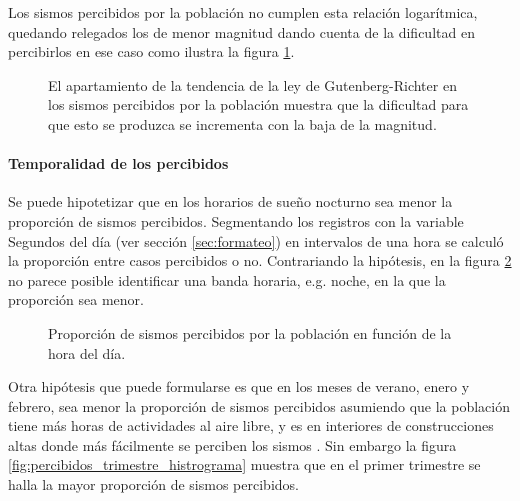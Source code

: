 \documentclass[a4paper]{report}
\begin{document}
Los sismos percibidos por la población no cumplen esta relación logarítmica, quedando relegados los de menor magnitud dando cuenta de la dificultad en percibirlos en ese caso como ilustra la figura \ref{fig:acumulado_anual_magnitud_percibidos}.
\begin{figure}[!ht]
\centering

\vspace{-0.8cm}
\caption{El apartamiento de la tendencia de la ley de Gutenberg-Richter en los sismos percibidos por la población muestra que la dificultad para que esto se produzca se incrementa con la baja de la magnitud.}
\label{fig:acumulado_anual_magnitud_percibidos}
\end{figure}



\paragraph{Temporalidad de los percibidos}\label{sec:temporal}
Se puede hipotetizar que en los horarios de sueño nocturno sea menor la proporción de sismos percibidos.
Segmentando los registros con la variable Segundos del día (ver sección \ref{sec:formateo}) en intervalos de una hora se calculó la proporción entre casos percibidos o no.
Contrariando la hipótesis, en la figura \ref{fig:histograma_percibidos_por_hora} no parece posible identificar una banda horaria, e.g. noche, en la que la proporción sea menor.

\begin{figure}[!ht]
\centering

\vspace{-0.8cm}
\caption{Proporción de sismos percibidos por la población en función de la hora del día.}
\label{fig:histograma_percibidos_por_hora}
\end{figure}

Otra hipótesis que puede formularse es que en los meses de verano, enero y febrero, sea menor la proporción de sismos percibidos asumiendo que la población tiene más horas de actividades al aire libre, y es en interiores de construcciones altas donde más fácilmente se perciben los sismos \cite{noauthor_intensidad_2022}.
Sin embargo la figura \ref{fig:percibidos_trimestre_histrograma} muestra que en el primer trimestre se halla la mayor proporción de sismos percibidos.
\end{document}
